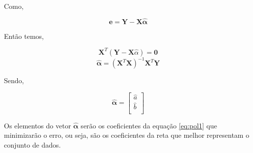 Como,

\[\bm{e = Y - X\hat{\alpha}}\]

Então temos,

\[\textbf{X}^T(\textbf{Y} - \textbf{X}\hat{\alpha})= \textbf{0}\]
\[\bm{\hat{\alpha}} = (\textbf{X}^T\textbf{X})^{-1}\textbf{X}^T\textbf{Y} \]

Sendo,

\[\bm{\hat{\alpha}} =
\begin{bmatrix}
 \hat{a}\\
 \hat{b}\\
\end{bmatrix}
\]

Os elementos do vetor $\bm{\hat{{\alpha}}}$ serão os coeficientes da equação \ref{eq:pol1} que minimizarão o erro, ou seja, são os coeficientes da reta que melhor representam o conjunto de dados.